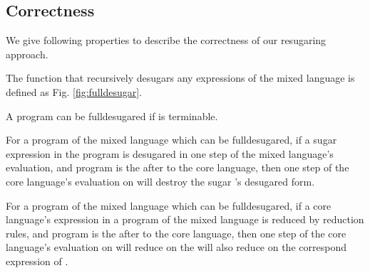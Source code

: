 \subsection{Correctness}
\label{mark:correct}

We give following properties to describe the correctness of our resugaring approach.
\begin{Def}[fulldesugar] The function that recursively desugars any expressions of the mixed language is defined as Fig.  \ref{fig:fulldesugar}.\end{Def}

A program  can be fulldesugared if  is terminable.



\begin{mythm} \label{thm1} For a program of the mixed language  which can be fulldesugared, if a sugar expression  in the program  is desugared in one step of the mixed language's evaluation, and program  is the  after  to the core language, then one step of the core language's evaluation on  will destroy the sugar 's desugared form.
\end{mythm}

\begin{mythm} \label{thm2} For a program of the mixed language  which can be fulldesugared, if a core language's expression  in a program  of the mixed language is reduced by reduction rules, and program  is the  after  to the core language, then one step of the core language's evaluation on  will reduce on the  will also reduce on the correspond expression of .
\end{mythm}

